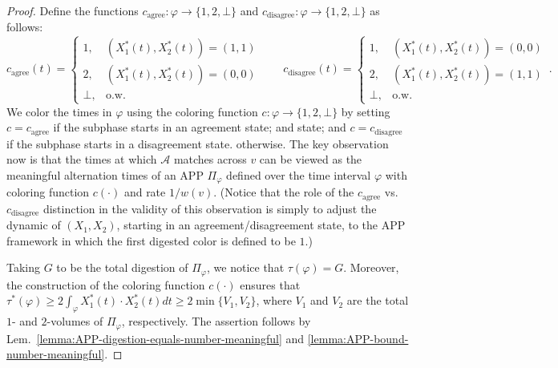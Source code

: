 \documentclass[11pt]{article}
\def\LongVersion{}
\def\LongVersionEnd{}
\def\ShortVersion{}
\def\ShortVersionEnd{}
\theoremstyle{definition}
\theoremstyle{plain}
\theoremstyle{definition}
\theoremstyle{plain}
\theoremstyle{definition}
\theoremstyle{plain}
\newcommand{\Lem}{Lem.}
\newcommand{\A}{\mathcal{A}}
\newcommand{\adv}[1]{{#1}^{*}}
\begin{document}
\begin{proof}
Define the functions
$c_{\text{agree}} : \varphi \rightarrow \{ 1, 2, \bot \}$
and
$c_{\text{disagree}} : \varphi \rightarrow \{ 1, 2, \bot \}$
as follows:
\[
c_{\text{agree}}(t)
=
\left\{
\begin{array}{ll}
1, & (\adv{X}_{1}(t), \adv{X}_{2}(t)) = (1, 1) \\
2, & (\adv{X}_{1}(t), \adv{X}_{2}(t)) = (0, 0) \\
\bot, & \text{o.w.}
\end{array}
\right.
\qquad
c_{\text{disagree}}(t)
=
\left\{
\begin{array}{ll}
1, & (\adv{X}_{1}(t), \adv{X}_{2}(t)) = (0, 0) \\
2, & (\adv{X}_{1}(t), \adv{X}_{2}(t)) = (1, 1) \\
\bot, & \text{o.w.}
\end{array}
\right. \, .
\]
We color the times in $\varphi$ using the coloring function
$c : \varphi \rightarrow \{ 1, 2, \bot \}$
by setting
$c = c_{\text{agree}}$
if the subphase starts in an agreement
\LongVersion %
state; and
\LongVersionEnd %
%
\ShortVersion %
state; and
\ShortVersionEnd %
$c = c_{\text{disagree}}$
\LongVersion %
if the subphase starts in a disagreement state.
\LongVersionEnd %
%
\ShortVersion %
otherwise.
\ShortVersionEnd %
The key observation now is that the times at which $\A$ matches across $v$
can be viewed as the meaningful alternation times of an APP $\Pi_{\varphi}$
defined over the time interval $\varphi$ with coloring function $c(\cdot)$ and
rate $1 / w(v)$.
(Notice that the role of the $c_{\text{agree}}$ vs.\ $c_{\text{disagree}}$
distinction in the validity of this observation is simply to adjust the
dynamic of $(X_{1}, X_{2})$, starting in an agreement/disagreement state, to
the APP framework in which the first digested color is defined to be $1$.)

Taking $G$ to be the total digestion of $\Pi_{\varphi}$, we notice that
$\tau(\varphi) = G$.
Moreover, the construction of the coloring function $c(\cdot)$ ensures that
$\adv{\tau}(\varphi)
\geq
2 \int_{\varphi} \adv{X}_{1}(t) \cdot \adv{X}_{2}(t) d t
\geq
2 \min \{ V_{1}, V_{2} \}$,
where $V_{1}$ and $V_{2}$ are the total $1$- and $2$-volumes of $\Pi_{\varphi}$,
respectively.
The assertion follows by \Lem{}\
\ref{lemma:APP-digestion-equals-number-meaningful} and
\ref{lemma:APP-bound-number-meaningful}.
\end{proof}
\ShortVersion \par\fussy \ShortVersionEnd
\end{document}

